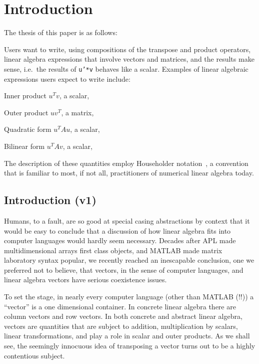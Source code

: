 \section{Introduction}

The thesis of this paper is as follows:

Users want to write, using compositions of the transpose and product operators,
linear algebra expressions that involve vectors and matrices, and the results
make sense, i.e.\ the results of \texttt{u'*v} behaves like a scalar. Examples of
linear algebraic expressions users expect to write include:

\begin{description}

\item{Inner product} $u^T v$, a scalar,
\item{Outer product} $u v^T$, a matrix,
\item{Quadratic form} $u^T A u$, a scalar,
\item{Bilinear form} $u^T A v$, a scalar,

\end{description}

The description of these quantities employ Householder
notation~\cite{Householder1953,Householder1955}, a convention that is familiar
to most, if not all, practitioners of numerical linear algebra today.



\subsection{Introduction (v1)}

Humans, to a fault, are so good at special casing abstractions
by context that it would be easy to conclude that a discussion
of how linear algebra fits into computer languages would hardly
seem necessary.  Decades after APL made multidimensional
arrays first class objects, and MATLAB made matrix laboratory
syntax popular,  we recently  reached an inescapable conclusion,
one we preferred not to believe, that
vectors, in the sense of computer languages,
and linear algebra vectors have serious coexistence issues.



To set the stage, in nearly every computer language (other than MATLAB (!!)) a
``vector'' is a one dimensional container. In concrete linear algebra there
are column vectors and row vectors. In both concrete and abstract linear
algebra, vectors are quantities that are subject to addition, multiplication by
scalars, linear transformations, and play a role in scalar and outer products.
As we shall see, the seemingly innocuous idea of transposing a vector turns
out to be a highly contentious subject.



